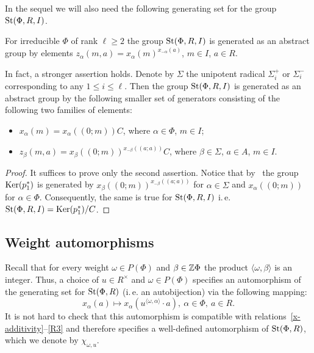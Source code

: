 In the sequel we will also need the following generating set for the group $\operatorname{St}(\Phi, R, I)$.
\begin{lemma}\label{lem:relative-generators}
    For irreducible $\Phi$ of rank $\ell \geq 2$ the group $\operatorname{St}(\Phi, R, I)$ is generated as an abstract group by elements $z_\alpha(m, a) = x_\alpha(m)^{x_{-\alpha}(a)}$, $m \in I$, $a \in R$.

    In fact, a stronger assertion holds.
    Denote by $\Sigma$ the unipotent radical $\Sigma^+_i$ or $\Sigma^-_i$ corresponding to any $1 \leq i \leq \ell$.
    Then the group $\operatorname{St}(\Phi, R, I)$ is generated as an abstract group by the following smaller set of generators consisting of the following two families of elements:
    \begin{itemize}
        \item $x_{\alpha}(m) = x_\alpha((0; m))C$, where $\alpha \in \Phi$, $m \in I$;
        \item $z_{\beta}(m, a) = x_\beta((0; m))^{x_{-\beta}((a; a))}C$, where $\beta \in \Sigma$, $a \in A$, $m \in I$.
    \end{itemize}
\end{lemma}
\begin{proof}
    It suffices to prove only the second assertion.
    Notice that by~\cite[Lemma~4]{S15} the group $\operatorname{Ker}(p_1^*)$ is generated by $x_{\beta}((0; m))^{x_{-\beta}((a; a))}$ for $\alpha \in \Sigma$ and $x_{\alpha}((0; m))$ for $\alpha \in \Phi$.
    Consequently, the same is true for $\operatorname{St}(\Phi, R, I)$ i.\,e. $\operatorname{St}(\Phi, R, I) = \operatorname{Ker}(p_1^*)/C$.
\end{proof}

\subsection{Weight automorphisms}\label{subsec:weight-automorphisms}
Recall that for every weight $\omega \in P(\Phi)$ and $\beta \in \mathbb{Z} \Phi$ the product $\langle \omega, \beta\rangle$ is an integer.
Thus, a choice of $u \in R^\times$ and $\omega \in P(\Phi)$ specifies an automorphism of the generating set for $\operatorname{St}(\Phi, R)$ (i.\,e. an autobijection) via the following mapping:
\begin{equation}\label{eq:chi-def} x_\alpha(a) \mapsto x_\alpha(u^{\langle\omega, \alpha\rangle} \cdot a),\ \alpha\in \Phi,\ a \in R. \end{equation}
It is not hard to check that this automorphism is compatible with relations~\eqref{x-additivity}--\eqref{R3} and therefore specifies a well-defined automorphism of $\operatorname{St}(\Phi, R)$, which we denote by $\chi_{\omega, u}$.

